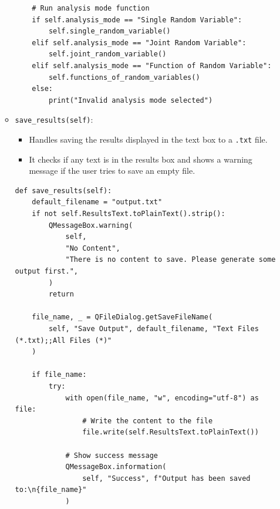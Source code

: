 \documentclass{article}
\begin{document}
\begin{enumerate}
\begin{itemize}
\begin{verbatim}
    # Run analysis mode function
    if self.analysis_mode == "Single Random Variable":
        self.single_random_variable()
    elif self.analysis_mode == "Joint Random Variable":
        self.joint_random_variable()
    elif self.analysis_mode == "Function of Random Variable":
        self.functions_of_random_variables()
    else:
        print("Invalid analysis mode selected")
            \end{verbatim}
            \item \texttt{save\_results(self)}:
            \begin{itemize}
                \item Handles saving the results displayed in the text box to a \texttt{.txt} file.
                 \item It checks if any text is in the results box and shows a warning message if the user tries to save an empty file.
            \end{itemize}
            \begin{verbatim}
def save_results(self):
    default_filename = "output.txt"
    if not self.ResultsText.toPlainText().strip():
        QMessageBox.warning(
            self,
            "No Content",
            "There is no content to save. Please generate some output first.",
        )
        return

    file_name, _ = QFileDialog.getSaveFileName(
        self, "Save Output", default_filename, "Text Files (*.txt);;All Files (*)"
    )

    if file_name:
        try:
            with open(file_name, "w", encoding="utf-8") as file:
                # Write the content to the file
                file.write(self.ResultsText.toPlainText())

            # Show success message
            QMessageBox.information(
                self, "Success", f"Output has been saved to:\n{file_name}"
            )


\end{verbatim}
\end{itemize}
\end{enumerate}
\end{document}
